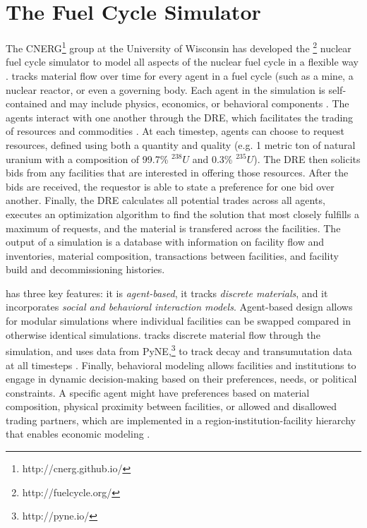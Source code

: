 \section{The \Cyclus Fuel Cycle Simulator}
\label{s_methods}

The \gls{CNERG}\footnote{http://cnerg.github.io/} group at the University of Wisconsin has developed the \Cyclus\footnote{http://fuelcycle.org/} nuclear fuel cycle simulator to model all aspects of the nuclear fuel cycle in a flexible way \cite{cyclus_v1_3}. \Cyclus tracks material flow over time for every agent in a fuel cycle (such as a mine, a nuclear reactor, or even a governing body.  Each agent in the simulation is self-contained and may include physics, economics, or behavioral components \cite{huff_open_2011,gidden_agent-based_2013,gidden_agent-based_2015}.  The agents interact with one another through the \gls{DRE}, which facilitates the trading of resources and commodities \cite{gidden_agent-based_2014}.  At each timestep, agents can choose to request resources, defined using both a quantity and quality (e.g. 1 metric ton of natural uranium with a composition of 99.7\% $^{238}U$ and 0.3\% $^{235}U$).  The \gls{DRE} then solicits bids from any facilities that are interested in offering those resources.  After the bids are received, the requestor is able to state a preference for one bid over another. Finally, the \gls{DRE} calculates all potential trades across all agents, executes an optimization algorithm to find the solution that most closely fulfills a maximum of requests, and the material is transfered across the facilities.  The output of a \Cyclus simulation is a database with information on facility flow and inventories, material composition, transactions between facilities, and facility build and decommissioning histories.

\Cyclus has three key features: it is \textit{agent-based}, it tracks \textit{discrete materials}, and it incorporates \textit{social and behavioral interaction models}. Agent-based design allows for modular simulations where individual facilities can be swapped compared in otherwise identical simulations\cite{jennings_agent-based_2000, taylor2014agent}. \Cyclus tracks discrete material flow through the simulation, and uses data from PyNE,\footnote{http://pyne.io/} to track decay and transumutation data at all timesteps \cite{Scopatz2012b, huff_integrated:_2013}. Finally, behavioral modeling allows facilities and institutions to engage in dynamic decision-making based on their preferences, needs, or political constraints.  A specific agent might have preferences based on material composition, physical proximity between facilities, or allowed and disallowed trading partners, which are implemented in a region-institution-facility hierarchy that enables economic modeling \cite{oliver_geniusv2:_2009}.

